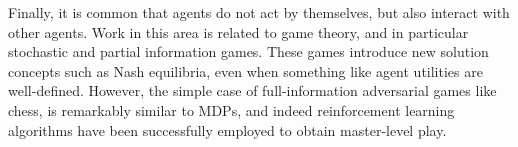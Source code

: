 Finally, it is common that agents do not act by themselves, but also interact with other agents. Work in this area is related to game theory, and in particular stochastic and partial information games. These games introduce new solution concepts such as Nash equilibria, even when something like agent utilities are well-defined. However, the simple case of full-information adversarial games like chess, is remarkably similar to MDPs, and indeed reinforcement learning algorithms have been successfully employed to obtain master-level play.

